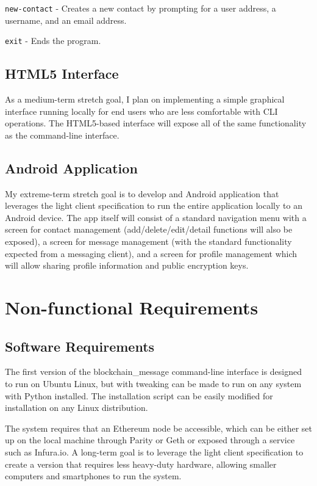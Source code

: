 \documentclass[titlepage]{report}
\begin{document}
\texttt{new-contact} - Creates a new contact by prompting for a user address, a username, and an email address.

\texttt{exit} - Ends the program.

\subsection{HTML5 Interface}
As a medium-term stretch goal, I plan on implementing a simple graphical interface running locally for end users who are less comfortable with CLI operations. The HTML5-based interface will expose all of the same functionality as the command-line interface.

\subsection{Android Application}
My extreme-term stretch goal is to develop and Android application that leverages the light client specification to run the entire application locally to an Android device. The app itself will consist of a standard navigation menu with a screen for contact management (add/delete/edit/detail functions will also be exposed), a screen for message management (with the standard functionality expected from a messaging client), and a screen for profile management which will allow sharing profile information and public encryption keys.

\section{Non-functional Requirements}
\subsection{Software Requirements}
The first version of the blockchain\_message command-line interface is designed to run on Ubuntu Linux, but with tweaking can be made to run on any system with Python installed. The installation script can be easily modified for installation on any Linux distribution.

The system requires that an Ethereum \gls{node} be accessible, which can be either set up on the local machine through Parity or Geth or exposed through a service such as Infura.io. A long-term goal is to leverage the light client specification to create a version that requires less heavy-duty hardware, allowing smaller computers and smartphones to run the system.
\end{document}
